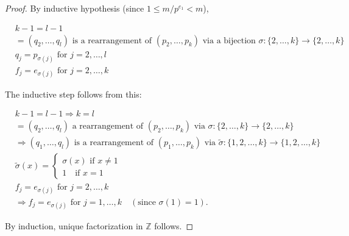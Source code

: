 \documentclass[11pt, draft]{article}
\begin{document}
\begin{proof}
    By inductive hypothesis (since \(1 \leq m / p^{e_1} < m\)),

    \[
        \begin{aligned}
             & k - 1 = l - 1                                                                                                                                         \\
             & = (q_2, \ldots, q_l) \text{ is a rearrangement of } (p_2, \ldots, p_k) \text{ via a bijection } \sigma: \{2, \ldots, k\} \rightarrow \{2, \ldots, k\} \\
             & q_j = p_{\sigma(j)} \text{ for } j = 2, \ldots, l                                                                                                     \\
             & f_j = e_{\sigma(j)} \text{ for } j = 2, \ldots, k
        \end{aligned}
    \]

    The inductive step follows from this:

    \[
        \begin{aligned}
             & k - 1 = l - 1 \Rightarrow k = l                                                                                                                                   \\
             & = (q_2, \ldots, q_l) \text{ a rearrangement of } (p_2, \ldots, p_k) \text{ via } \sigma: \{2, \ldots, k\} \rightarrow \{2, \ldots, k\}                            \\
             & \Rightarrow (q_1, \ldots, q_l) \text{ is a rearrangement of } (p_1, \ldots, p_k) \text{ via } \tilde{\sigma}: \{1, 2, \ldots, k\} \rightarrow \{1, 2, \ldots, k\} \\
             & \tilde{\sigma}(x) =
            \begin{cases}
                \sigma(x) \text{ if } x \neq 1 \\
                1 \quad \text{if } x = 1
            \end{cases}                                                                                                                                       \\
             & f_j = e_{\sigma(j)} \text{ for } j = 2, \ldots, k                                                                                                                 \\
             & \Rightarrow f_j = e_{\sigma(j)} \text{ for } j = 1, \ldots, k \quad (\text{since } \sigma(1) = 1).
        \end{aligned}
    \]

    By induction, unique factorization in \(\mathbb{Z}\) follows.
\end{proof}
\end{document}
